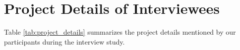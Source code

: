 \section{Project Details of Interviewees}
\label{appendix:project}
Table \ref{tab:project_details} summarizes the project details mentioned by our participants during the interview study.
